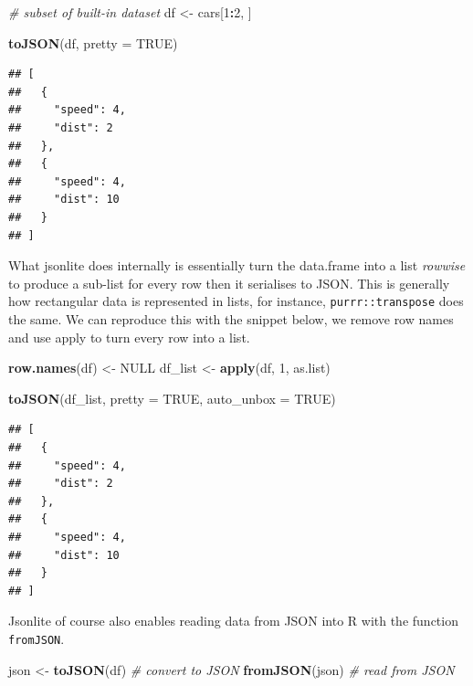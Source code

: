 \documentclass[
]{krantz}
\makeatletter
\newenvironment{Shaded}{\begin{snugshade}}{\end{snugshade}}
\newcommand{\CommentTok}[1]{\textcolor[rgb]{0.37,0.37,0.37}{\textit{#1}}}
\newcommand{\DataTypeTok}[1]{\textcolor[rgb]{0.27,0.27,0.27}{#1}}
\newcommand{\DecValTok}[1]{\textcolor[rgb]{0.06,0.06,0.06}{#1}}
\newcommand{\KeywordTok}[1]{\textcolor[rgb]{0.27,0.27,0.27}{\textbf{#1}}}
\newcommand{\NormalTok}[1]{#1}
\newcommand{\OperatorTok}[1]{\textcolor[rgb]{0.43,0.43,0.43}{\textbf{#1}}}
\newcommand{\OtherTok}[1]{\textcolor[rgb]{0.37,0.37,0.37}{#1}}
\newcommand{\StringTok}[1]{\textcolor[rgb]{0.5,0.5,0.5}{#1}}
\newenvironment{kframe}{%
\medskip{}
\setlength{\fboxsep}{.8em}
 \def\at@end@of@kframe{}%
 \ifinner\ifhmode%
  \def\at@end@of@kframe{\end{minipage}}%
  \begin{minipage}{\columnwidth}%
 \fi\fi%
 \def\FrameCommand##1{\hskip\@totalleftmargin \hskip-\fboxsep
 \colorbox{shadecolor}{##1}\hskip-\fboxsep
     \hskip-\linewidth \hskip-\@totalleftmargin \hskip\columnwidth}%
 \MakeFramed {\advance\hsize-\width
   \@totalleftmargin\z@ \linewidth\hsize
   \@setminipage}}%
 {\par\unskip\endMakeFramed%
 \at@end@of@kframe}
\renewenvironment{Shaded}{\begin{kframe}}{\end{kframe}}
\makeatother
\begin{document}
\begin{Shaded}
\begin{Highlighting}[]
\CommentTok{\# subset of built{-}in dataset}
\NormalTok{df <{-}}\StringTok{ }\NormalTok{cars[}\DecValTok{1}\OperatorTok{:}\DecValTok{2}\NormalTok{, ]}

\KeywordTok{toJSON}\NormalTok{(df, }\DataTypeTok{pretty =} \OtherTok{TRUE}\NormalTok{)}
\end{Highlighting}
\end{Shaded}

\begin{verbatim}
## [
##   {
##     "speed": 4,
##     "dist": 2
##   },
##   {
##     "speed": 4,
##     "dist": 10
##   }
## ]
\end{verbatim}

What jsonlite does internally is essentially turn the data.frame into a list \emph{rowwise} to produce a sub-list for every row then it serialises to JSON. This is generally how rectangular data is represented in lists, for instance, \texttt{purrr::transpose} does the same. We can reproduce this with the snippet below, we remove row names and use apply to turn every row into a list.

\begin{Shaded}
\begin{Highlighting}[]
\KeywordTok{row.names}\NormalTok{(df) <{-}}\StringTok{ }\OtherTok{NULL}
\NormalTok{df\_list <{-}}\StringTok{ }\KeywordTok{apply}\NormalTok{(df, }\DecValTok{1}\NormalTok{, as.list)}

\KeywordTok{toJSON}\NormalTok{(df\_list, }\DataTypeTok{pretty =} \OtherTok{TRUE}\NormalTok{, }\DataTypeTok{auto\_unbox =} \OtherTok{TRUE}\NormalTok{)}
\end{Highlighting}
\end{Shaded}

\begin{verbatim}
## [
##   {
##     "speed": 4,
##     "dist": 2
##   },
##   {
##     "speed": 4,
##     "dist": 10
##   }
## ]
\end{verbatim}

Jsonlite of course also enables reading data from JSON into R with the function \texttt{fromJSON}.

\begin{Shaded}
\begin{Highlighting}[]
\NormalTok{json <{-}}\StringTok{ }\KeywordTok{toJSON}\NormalTok{(df) }\CommentTok{\# convert to JSON}
\KeywordTok{fromJSON}\NormalTok{(json) }\CommentTok{\# read from JSON}
\end{Highlighting}
\end{Shaded}
\end{document}

